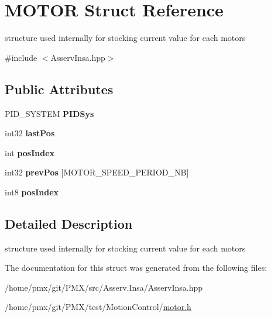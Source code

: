 \hypertarget{structMOTOR}{}\section{M\+O\+T\+OR Struct Reference}
\label{structMOTOR}


structure used internally for stocking current value for each motors  




{\ttfamily \#include $<$Asserv\+Insa.\+hpp$>$}

\subsection*{Public Attributes}
\begin{DoxyCompactItemize}
\item 
\mbox{\label{structMOTOR_ad494bbc3103cda3f35bdd7fc1b5d28ab}} 
P\+I\+D\+\_\+\+S\+Y\+S\+T\+EM {\bfseries P\+I\+D\+Sys}
\item 
\mbox{\label{structMOTOR_a13e2bfbd2f8585027ace0233711f5fcb}} 
int32 {\bfseries last\+Pos}
\item 
\mbox{\label{structMOTOR_a5c9997178b28567b10110ed7bad82d38}} 
int {\bfseries pos\+Index}
\item 
\mbox{\label{structMOTOR_aad3591d98b4813e08a413f730e68f455}} 
int32 {\bfseries prev\+Pos} \mbox{[}M\+O\+T\+O\+R\+\_\+\+S\+P\+E\+E\+D\+\_\+\+P\+E\+R\+I\+O\+D\+\_\+\+NB\mbox{]}
\item 
\mbox{\label{structMOTOR_a67baa250d4305eb731d1463aef8c912f}} 
int8 {\bfseries pos\+Index}
\end{DoxyCompactItemize}


\subsection{Detailed Description}
structure used internally for stocking current value for each motors 

The documentation for this struct was generated from the following files\+:\begin{DoxyCompactItemize}
\item 
/home/pmx/git/\+P\+M\+X/src/\+Asserv.\+Insa/Asserv\+Insa.\+hpp\item 
/home/pmx/git/\+P\+M\+X/test/\+Motion\+Control/\hyperlink{motor_8h}{motor.\+h}\end{DoxyCompactItemize}
